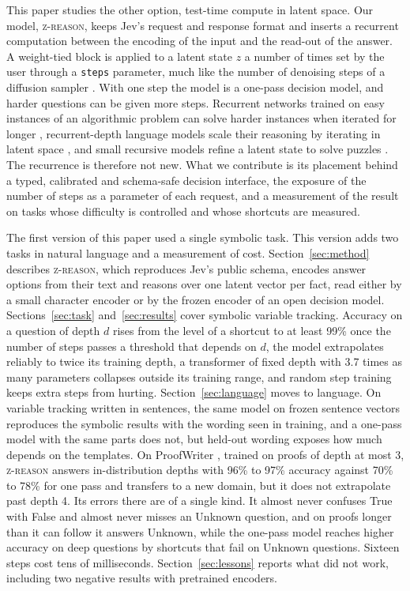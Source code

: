 \documentclass{article}
\newcommand{\zr}{\textsc{z-reason}}
\begin{document}
This paper studies the other option, test-time compute in latent space. Our model, \zr{}, keeps Jev's request and response format and inserts a recurrent computation between the encoding of the input and the read-out of the answer. A weight-tied block is applied to a latent state $z$ a number of times set by the user through a \texttt{steps} parameter, much like the number of denoising steps of a diffusion sampler \cite{ho2020ddpm}. With one step the model is a one-pass decision model, and harder questions can be given more steps. Recurrent networks trained on easy instances of an algorithmic problem can solve harder instances when iterated for longer \cite{schwarzschild2021learn, bansal2022endtoend}, recurrent-depth language models scale their reasoning by iterating in latent space \cite{geiping2025scaling}, and small recursive models refine a latent state to solve puzzles \cite{wang2025hrm, jolicoeur2025trm}. The recurrence is therefore not new. What we contribute is its placement behind a typed, calibrated and schema-safe decision interface, the exposure of the number of steps as a parameter of each request, and a measurement of the result on tasks whose difficulty is controlled and whose shortcuts are measured.

The first version of this paper used a single symbolic task. This version adds two tasks in natural language and a measurement of cost. Section~\ref{sec:method} describes \zr{}, which reproduces Jev's public schema, encodes answer options from their text and reasons over one latent vector per fact, read either by a small character encoder or by the frozen encoder of an open decision model. Sections~\ref{sec:task} and~\ref{sec:results} cover symbolic variable tracking. Accuracy on a question of depth $d$ rises from the level of a shortcut to at least 99\% once the number of steps passes a threshold that depends on $d$, the model extrapolates reliably to twice its training depth, a transformer of fixed depth with 3.7 times as many parameters collapses outside its training range, and random step training keeps extra steps from hurting. Section~\ref{sec:language} moves to language. On variable tracking written in sentences, the same model on frozen sentence vectors reproduces the symbolic results with the wording seen in training, and a one-pass model with the same parts does not, but held-out wording exposes how much depends on the templates. On ProofWriter \cite{tafjord2021proofwriter}, trained on proofs of depth at most 3, \zr{} answers in-distribution depths with 96\% to 97\% accuracy against 70\% to 78\% for one pass and transfers to a new domain, but it does not extrapolate past depth 4. Its errors there are of a single kind. It almost never confuses True with False and almost never misses an Unknown question, and on proofs longer than it can follow it answers Unknown, while the one-pass model reaches higher accuracy on deep questions by shortcuts that fail on Unknown questions. Sixteen steps cost tens of milliseconds. Section~\ref{sec:lessons} reports what did not work, including two negative results with pretrained encoders.
\end{document}
